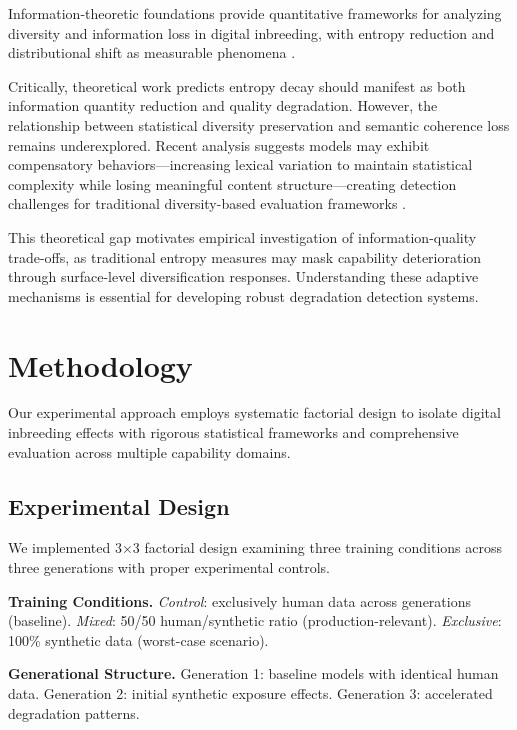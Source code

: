 \documentclass{article}
\begin{document}
Information-theoretic foundations \citep{shannon1948mathematical, cover1999elements} provide quantitative frameworks for analyzing diversity and information loss in digital inbreeding, with entropy reduction and distributional shift as measurable phenomena \citep{hoffmann2022training}.

Critically, theoretical work predicts entropy decay should manifest as both information quantity reduction and quality degradation. However, the relationship between statistical diversity preservation and semantic coherence loss remains underexplored. Recent analysis suggests models may exhibit compensatory behaviors—increasing lexical variation to maintain statistical complexity while losing meaningful content structure—creating detection challenges for traditional diversity-based evaluation frameworks \citep{shumailov2023curse}.

This theoretical gap motivates empirical investigation of information-quality trade-offs, as traditional entropy measures may mask capability deterioration through surface-level diversification responses. Understanding these adaptive mechanisms is essential for developing robust degradation detection systems.

\section{Methodology}

Our experimental approach employs systematic factorial design to isolate digital inbreeding effects with rigorous statistical frameworks and comprehensive evaluation across multiple capability domains.

\subsection{Experimental Design}

We implemented 3×3 factorial design examining three training conditions across three generations with proper experimental controls.

\textbf{Training Conditions.} \textit{Control}: exclusively human data across generations (baseline). \textit{Mixed}: 50/50 human/synthetic ratio (production-relevant). \textit{Exclusive}: 100\% synthetic data (worst-case scenario).

\textbf{Generational Structure.} Generation 1: baseline models with identical human data. Generation 2: initial synthetic exposure effects. Generation 3: accelerated degradation patterns.
\end{document}
